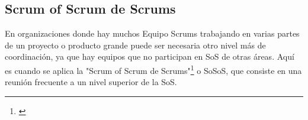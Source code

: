 \subsection{Scrum of Scrum de Scrums}

En organizaciones donde hay muchos Equipo Scrums trabajando en varias partes de un proyecto o producto grande puede ser necesaria otro nivel más de coordinación, ya que hay equipos que no participan en SoS de otras áreas. Aquí es cuando se aplica la "Scrum of Scrum de Scrums"\footnote{\cite{SBOK-2013}} o SoSoS, que consiste en una reunión frecuente a un nivel superior de la SoS.



